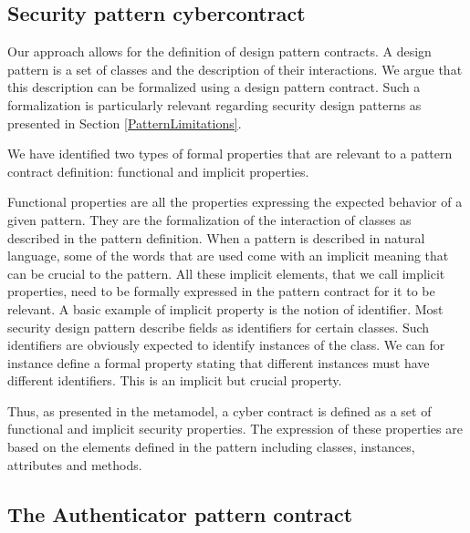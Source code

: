 
\subsection{Security pattern cybercontract}

Our approach allows for the definition of design pattern contracts. A design pattern is a set of classes and the description of their interactions. We argue that this description can be formalized using a design pattern contract. Such a formalization is particularly relevant regarding security design patterns as presented in Section \ref{PatternLimitations}. 

We have identified two types of formal properties that are relevant to a pattern contract definition: functional and implicit properties.

Functional properties are all the properties expressing the expected behavior of a given pattern. They are the formalization of the interaction of classes as described in the pattern definition. When a pattern is described in natural language, some of the words that are used come with an implicit meaning that can be crucial to the pattern. All these implicit elements, that we call implicit properties, need to be formally expressed in the pattern contract for it to be relevant. A basic example of implicit property is the notion of identifier. Most security design pattern describe fields as identifiers for certain classes. Such identifiers are obviously expected to identify instances of the class. We can for instance define a formal property stating that different instances must have different identifiers. This is an implicit but crucial property.

Thus, as presented in the metamodel, a cyber contract is defined as a set of functional and implicit security properties. The expression of these properties are based on the elements defined in the pattern including classes, instances, attributes and methods. 


\subsection{The Authenticator pattern contract}
\label{label:authenticatorContract}

